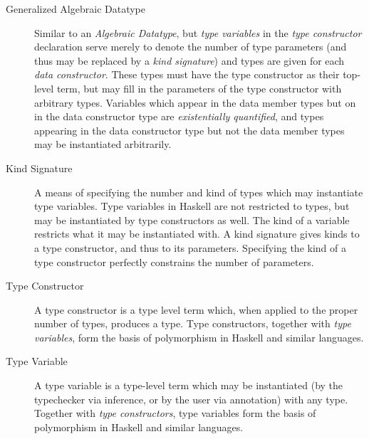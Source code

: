 \begin{description}
\item[Generalized Algebraic Datatype] Similar to an {\em Algebraic Datatype},
but {\em type variables} in the {\em type constructor} declaration serve merely
to denote the number of type parameters (and thus may be replaced by a
{\em kind signature}) and types are given for each {\em data constructor}. These
types must have the type constructor as their top-level term, but may fill in
the parameters of the type constructor with arbitrary types. Variables which
appear in the data member types but on in the data constructor type are
{\em existentially quantified}, and types appearing in the data constructor
type but not the data member types may be instantiated arbitrarily.

\item[Kind Signature] A means of specifying the number and kind of types which
may instantiate type variables. Type variables in Haskell are not restricted to
types, but may be instantiated by type constructors as well. The kind of a
variable restricts what it may be instantiated with. A kind signature gives
kinds to a type constructor, and thus to its parameters. Specifying the kind
of a type constructor perfectly constrains the number of parameters.

\item[Type Constructor] A type constructor is a type level term which, when
applied to the proper number of types, produces a type. Type constructors,
together with {\em type variables}, form the basis of polymorphism in Haskell
and similar languages.

\item[Type Variable] A type variable is a type-level term which may be 
instantiated (by the typechecker via inference, or by the user via annotation)
with any type. Together with {\em type constructors}, type variables form the
basis of polymorphism in Haskell and similar languages.
\end{description}